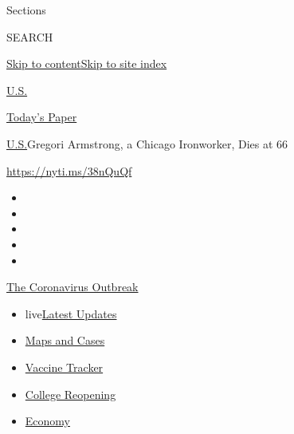 Sections

SEARCH

\protect\hyperlink{site-content}{Skip to
content}\protect\hyperlink{site-index}{Skip to site index}

\href{https://www.nytimes3xbfgragh.onion/section/us}{U.S.}

\href{https://myaccount.nytimes3xbfgragh.onion/auth/login?response_type=cookie\&client_id=vi}{}

\href{https://www.nytimes3xbfgragh.onion/section/todayspaper}{Today's
Paper}

\href{/section/us}{U.S.}\textbar{}Gregori Armstrong, a Chicago
Ironworker, Dies at 66

\url{https://nyti.ms/38nQuQf}

\begin{itemize}
\item
\item
\item
\item
\item
\end{itemize}

\href{https://www.nytimes3xbfgragh.onion/news-event/coronavirus?action=click\&pgtype=Article\&state=default\&region=TOP_BANNER\&context=storylines_menu}{The
Coronavirus Outbreak}

\begin{itemize}
\tightlist
\item
  live\href{https://www.nytimes3xbfgragh.onion/2020/08/04/world/coronavirus-covid-19.html?action=click\&pgtype=Article\&state=default\&region=TOP_BANNER\&context=storylines_menu}{Latest
  Updates}
\item
  \href{https://www.nytimes3xbfgragh.onion/interactive/2020/us/coronavirus-us-cases.html?action=click\&pgtype=Article\&state=default\&region=TOP_BANNER\&context=storylines_menu}{Maps
  and Cases}
\item
  \href{https://www.nytimes3xbfgragh.onion/interactive/2020/science/coronavirus-vaccine-tracker.html?action=click\&pgtype=Article\&state=default\&region=TOP_BANNER\&context=storylines_menu}{Vaccine
  Tracker}
\item
  \href{https://www.nytimes3xbfgragh.onion/2020/08/02/us/covid-college-reopening.html?action=click\&pgtype=Article\&state=default\&region=TOP_BANNER\&context=storylines_menu}{College
  Reopening}
\item
  \href{https://www.nytimes3xbfgragh.onion/live/2020/08/03/business/stock-market-today-coronavirus?action=click\&pgtype=Article\&state=default\&region=TOP_BANNER\&context=storylines_menu}{Economy}
\end{itemize}

